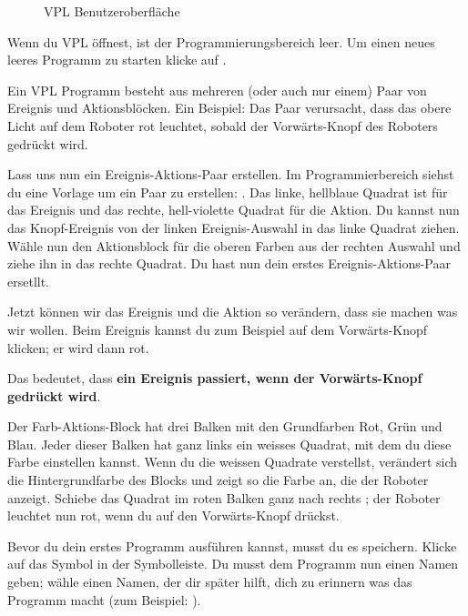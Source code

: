 \begin{figure}[hbt]
\caption{VPL Benutzeroberfläche}\label{fig.gui}
\end{figure}



Wenn du VPL öffnest, ist der Programmierungsbereich leer. Um einen neues leeres
Programm zu starten klicke auf .

Ein VPL Programm besteht aus mehreren (oder auch nur einem) Paar von Ereignis
und Aktionsblöcken. Ein Beispiel: Das Paar  verursacht, dass das
obere Licht auf dem Roboter rot leuchtet, sobald der Vorwärts-Knopf des
Roboters gedrückt wird.


Lass uns nun ein Ereignis-Aktions-Paar erstellen. Im Programmierbereich siehst
du eine Vorlage um ein Paar zu erstellen: . Das
linke, hellblaue Quadrat ist für das Ereignis und das rechte, hell-violette
Quadrat für die Aktion. Du kannst nun das Knopf-Ereignis 
von der linken Ereignis-Auswahl in das linke Quadrat ziehen. Wähle nun den
Aktionsblock für die oberen Farben  aus der rechten
Auswahl und ziehe ihn in das rechte Quadrat. Du hast nun dein erstes
Ereignis-Aktions-Paar ersetllt.

Jetzt können wir das Ereignis und die Aktion so verändern, dass sie machen was
wir wollen. Beim Ereignis kannst du zum Beispiel auf dem Vorwärts-Knopf
klicken; er wird dann rot.

Das bedeutet, dass \textbf{ein Ereignis passiert, wenn der Vorwärts-Knopf
gedrückt wird}.

Der Farb-Aktions-Block hat drei Balken mit den Grundfarben Rot, Grün und Blau.
Jeder dieser Balken hat ganz links ein weisses Quadrat, mit dem du diese Farbe
einstellen kannst. Wenn du die weissen Quadrate verstellst, verändert sich die
Hintergrundfarbe des Blocks und zeigt so die Farbe an, die der Roboter anzeigt.
Schiebe das Quadrat im roten Balken ganz nach rechts ; der Roboter
leuchtet nun rot, wenn du auf den Vorwärts-Knopf drückst. 


Bevor du dein erstes Programm ausführen kannst, musst du es speichern. Klicke
auf das Symbol  in der Symbolleiste. Du musst dem Programm nun
einen Namen geben; wähle einen Namen, der dir später hilft, dich zu erinnern
was das Programm macht (zum Beispiel: ).

